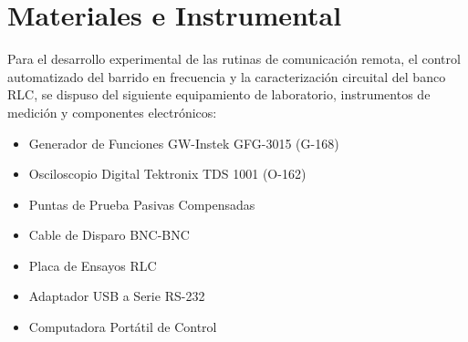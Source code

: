 \chapter{Materiales e Instrumental}

Para el desarrollo experimental de las rutinas de comunicación remota, el control automatizado del barrido en
frecuencia y la caracterización circuital del banco RLC, se dispuso del siguiente equipamiento de laboratorio,
instrumentos de medición y componentes electrónicos:

\begin{itemize}
    \item Generador de Funciones GW-Instek GFG-3015 (G-168)
    \item Osciloscopio Digital Tektronix TDS 1001 (O-162)
    \item Puntas de Prueba Pasivas Compensadas
    \item Cable de Disparo BNC-BNC
    \item Placa de Ensayos RLC
    \item Adaptador USB a Serie RS-232
    \item Computadora Portátil de Control
\end{itemize}

